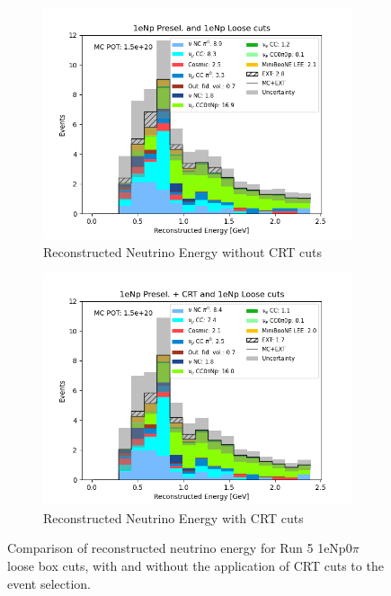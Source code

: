 \begin{figure}[H] \centering
    \begin{subfigure}[t]{0.45\linewidth}
        \includegraphics[width=\linewidth]{technote/EventSelections/FiguresCRT/NPloose.png}
        \caption{Reconstructed Neutrino Energy without CRT cuts}
    \end{subfigure}%
    \hspace{0.45cm}%
    \begin{subfigure}[t]{0.45\linewidth}
        \includegraphics[width=\linewidth]{technote/EventSelections/FiguresCRT/NPlooseCRT.png}%
        \caption{Reconstructed Neutrino Energy with CRT cuts}
    \end{subfigure}%
    \caption{Comparison of reconstructed neutrino energy for Run 5 1eNp0$\pi$ loose box cuts, with and without the application of CRT cuts to the event selection.}
    \label{fig:1eNp_loosecuts}
\end{figure}

